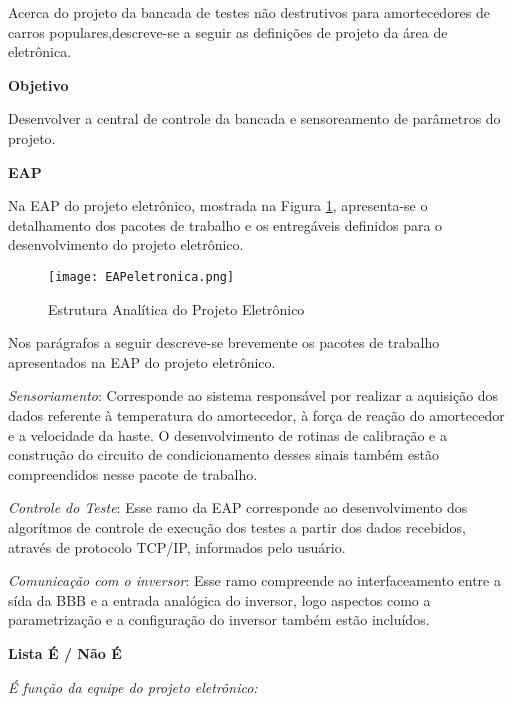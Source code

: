 	Acerca do projeto da bancada de testes não destrutivos para amortecedores de carros populares,descreve-se a seguir as definições de projeto da área de eletrônica.

	\textbf{Objetivo}

	Desenvolver a central de controle da bancada e sensoreamento de parâmetros do projeto.

	\textbf{EAP}

	Na EAP do projeto eletrônico, mostrada na Figura \ref{EAPeletronica}, apresenta-se o detalhamento dos pacotes de trabalho e os entregáveis definidos para o desenvolvimento do projeto eletrônico.

	\begin{figure}[!h]
		\centering
		\texttt{[image: EAPeletronica.png]}
		\caption{Estrutura Analítica do Projeto Eletrônico}
		\label{EAPeletronica}
	\end{figure}


	Nos parágrafos a seguir descreve-se brevemente os pacotes de trabalho apresentados na EAP do projeto eletrônico. 

	\textit{Sensoriamento}: Corresponde ao sistema responsável por realizar a aquisição dos dados referente à temperatura do amortecedor, à força de reação do amortecedor e a velocidade da haste. O desenvolvimento de rotinas de calibração e a construção do circuito de condicionamento desses sinais também estão compreendidos nesse pacote de trabalho.

	\textit{Controle do Teste}: Esse ramo da EAP corresponde ao desenvolvimento dos algorítmos de controle de execução dos testes a partir dos dados recebidos, através de protocolo TCP/IP, informados pelo usuário. 

	\textit{Comunicação com o inversor}: Esse ramo compreende ao interfaceamento entre a sída da BBB e a entrada analógica do inversor, logo aspectos como a parametrização e a configuração do inversor também estão incluídos.

	\textbf{Lista É / Não É}

	\textit{ É função da equipe do projeto eletrônico:}

